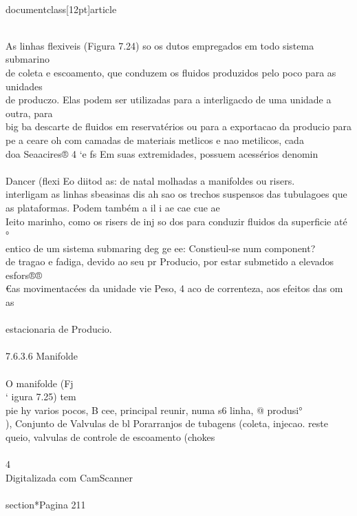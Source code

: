 \\documentclass[12pt]{article}
\begin{document}
\\
As linhas flexiveis (Figura 7.24) so os dutos empregados em todo sistema submarino\\
de coleta e escoamento, que conduzem os fluidos produzidos pelo poco para as unidades\\
de produczo. Elas podem ser utilizadas para a interligacdo de uma unidade a outra, para\\
big ba descarte de fluidos em reservatérios ou para a exportacao da producio para\\
pe a ceare oh com camadas de materiais metlicos e nao metilicos, cada\\
doa Seaacires® 4 ‘e fs Em suas extremidades, possuem acessérios denomin\\
\\
Dancer (flexi Eo diitod as: de natal molhadas a manifoldes ou risers.\\
interligam as linhas sbeasinas dis ah sao os trechos suspensos das tubulagoes que\\
as plataformas. Podem também a il i ae cae cue ae\\
Ieito marinho, como os risers de inj so dos para conduzir fluidos da superficie até °\\
entico de um sistema submaring deg ge ee: Constieul-se num component?\\
de tragao e fadiga, devido ao seu pr Producio, por estar submetido a elevados esfors®®\\
€as movimentacées da unidade vie Peso, 4 aco de correnteza, aos efeitos das om as\\
\\
estacionaria de Producio.\\
\\
7.6.3.6 Manifolde\\
\\
O manifolde (Fj\\
‘ igura 7.25) tem\\
pie hy varios pocos, B cee, principal reunir, numa s6 linha, @ produsi°\\
), Conjunto de Valvulas de bl Porarranjos de tubagens (coleta, injecao. reste\\
queio, valvulas de controle de escoamento (chokes\\
\\
4\\
Digitalizada com CamScanner\\

\\section*{Pagina 211}
\end{document}
